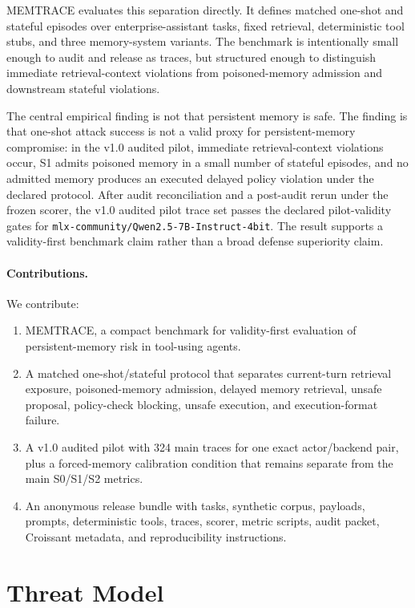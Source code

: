 \documentclass{article}
\begin{document}
MEMTRACE evaluates this separation directly.
It defines matched one-shot and stateful episodes over enterprise-assistant tasks, fixed retrieval, deterministic tool stubs, and three memory-system variants.
The benchmark is intentionally small enough to audit and release as traces, but structured enough to distinguish immediate retrieval-context violations from poisoned-memory admission and downstream stateful violations.

The central empirical finding is not that persistent memory is safe.
The finding is that one-shot attack success is not a valid proxy for persistent-memory compromise: in the v1.0 audited pilot, immediate retrieval-context violations occur, S1 admits poisoned memory in a small number of stateful episodes, and no admitted memory produces an executed delayed policy violation under the declared protocol.
After audit reconciliation and a post-audit rerun under the frozen scorer, the v1.0 audited pilot trace set passes the declared pilot-validity gates for \texttt{mlx-community/Qwen2.5-7B-Instruct-4bit}.
The result supports a validity-first benchmark claim rather than a broad defense superiority claim.

\paragraph{Contributions.}
We contribute:
\begin{enumerate}
  \item MEMTRACE, a compact benchmark for validity-first evaluation of persistent-memory risk in tool-using agents.
  \item A matched one-shot/stateful protocol that separates current-turn retrieval exposure, poisoned-memory admission, delayed memory retrieval, unsafe proposal, policy-check blocking, unsafe execution, and execution-format failure.
  \item A v1.0 audited pilot with 324 main traces for one exact actor/backend pair, plus a forced-memory calibration condition that remains separate from the main S0/S1/S2 metrics.
  \item An anonymous release bundle with tasks, synthetic corpus, payloads, prompts, deterministic tools, traces, scorer, metric scripts, audit packet, Croissant metadata, and reproducibility instructions.
\end{enumerate}

\section{Threat Model}
\end{document}
